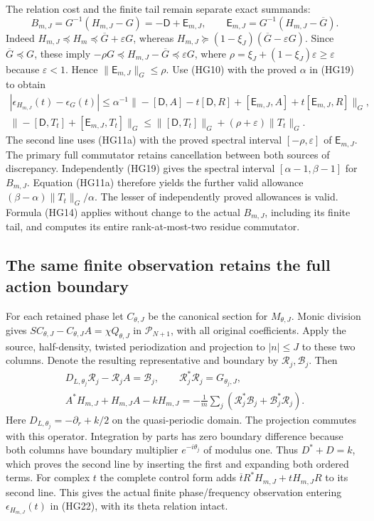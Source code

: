 The relation cost and the finite tail remain separate exact summands:
\[
 B_{m,J}=G^{-1}(H_{m,J}-G)=-\mathsf D+\mathsf E_{m,J},
 \qquad \mathsf E_{m,J}=G^{-1}(H_{m,J}-\overline G).
 \tag{HG21}
\]
Indeed $H_{m,J}\preceq H_m\preceq\overline G+\varepsilon G$,
whereas
$H_{m,J}\succeq(1-\xi_J)(\overline G-\varepsilon G)$.
Since $\overline G\preceq G$, these imply
$-\rho G\preceq H_{m,J}-\overline G\preceq\varepsilon G$,
where $\rho=\xi_J+(1-\xi_J)\varepsilon\ge\varepsilon$ because
$\varepsilon<1$. Hence $\|\mathsf E_{m,J}\|_G\le\rho$.
Use (HG10) with the proved $\alpha$ in (HG19) to obtain
\[
\begin{gathered}
 |\epsilon_{H_{m,J}}(t)-\epsilon_G(t)|
 \le\alpha^{-1}\|
 -[\mathsf D,A]-t[\mathsf D,R]
 +[\mathsf E_{m,J},A]+t[\mathsf E_{m,J},R]\|_G,\\
 \|-[\mathsf D,T_t]+[\mathsf E_{m,J},T_t]\|_G
 \le\|[\mathsf D,T_t]\|_G+(\rho+\varepsilon)\|T_t\|_G .
\end{gathered}\tag{HG22}
\]
The second line uses (HG11a) with the proved spectral interval
$[-\rho,\varepsilon]$ of $\mathsf E_{m,J}$.
The primary full commutator retains cancellation between both sources
of discrepancy. Independently (HG19) gives the spectral interval
$[\alpha-1,\beta-1]$ for $B_{m,J}$. Equation (HG11a) therefore
yields the further valid allowance
$(\beta-\alpha)\|T_t\|_G/\alpha$.
The lesser of independently proved allowances is valid. Formula (HG14)
applies without change to the actual $B_{m,J}$, including its finite
tail, and computes its entire rank-at-most-two residue commutator.

\subsection{The same finite observation retains the full action boundary}

For each retained phase let $C_{\theta,J}$ be the canonical section
for $M_{\theta,J}$. Monic division gives
$SC_{\theta,J}-C_{\theta,J}A=\chi Q_{\theta,J}$ in
$\mathcal P_{N+1}$, with all original coefficients. Apply the source,
half-density, twisted periodization and projection to $|n|\le J$
to these two columns. Denote the resulting representative and boundary
by $\mathscr R_j,\mathscr B_j$. Then
\[
\begin{gathered}
 D_{L,\theta_j}\mathscr R_j-\mathscr R_jA=\mathscr B_j,
 \qquad \mathscr R_j^*\mathscr R_j=G_{\theta_j,J},\\
 A^*H_{m,J}+H_{m,J}A-kH_{m,J}
   =-\frac1m\sum_j(\mathscr R_j^*\mathscr B_j+
                              \mathscr B_j^*\mathscr R_j).
\end{gathered}\tag{HG23}
\]
Here $D_{L,\theta_j}=-\partial_r+k/2$ on the quasi-periodic domain.
The projection commutes with this operator. Integration by parts has
zero boundary difference because both columns have boundary multiplier
$e^{-i\theta_j}$ of modulus one. Thus $D^*+D=k$, which proves the
second line by inserting the first and expanding both ordered terms.
For complex $t$ the complete control form adds
$\overline t R^*H_{m,J}+tH_{m,J}R$ to its second line.
This gives the actual finite phase/frequency observation entering
$\epsilon_{H_{m,J}}(t)$ in (HG22), with its theta relation intact.

